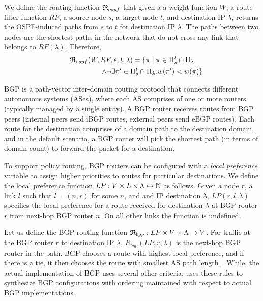 We define the routing function 
$\mathfrak{R}_{ospf}$ 
that given a 
a weight function $W$,
a route-filter function $RF$,
a source node $s$,
a target node $t$,
and destination IP 
$\lambda$,
returns the OSPF-induced paths from $s$ to $t$ for destination IP $\lambda$.
The paths between two nodes are
the shortest paths in the network
that do not cross any link that belongs to $RF(\lambda)$. 
 Therefore,
\begin{multline}
\mathfrak{R}_{ospf}(W,RF,s,t,\lambda) = \{\pi \mid  \pi\in \Pi_s^t\cap \Pi_\lambda\\
\hspace{2cm} \wedge \neg\exists \pi'\in\Pi_s^t\cap \Pi_\lambda . w(\pi')< w(\pi)\}
\end{multline}



BGP is a path-vector inter-domain 
routing protocol that connects 
different autonomous systems (ASes), where each AS
comprises of one or more routers (typically managed
by a single entity). A BGP router receives routes 
from BGP peers (internal peers send iBGP routes, 
external peers send eBGP routes). Each route 
for the destination comprises of a domain path
 to the destination domain, and in the default
 scenario, a BGP router will pick the shortest
 path (in terms of domain count) to forward
 the packet for a destination. 
 
To support policy routing, BGP routers can be 
configured with a \emph{local preference} variable
to assign higher priorities to routes for particular
destinations. We define the local preference function 
$LP: V \times L \times \Lambda \mapsto \mathbb{N}$ as follows.
Given a node $r$, a link $l$ such that $l=(n,r)$ for some $n$,
and and IP destination $\lambda$,
  $LP(r, l, \lambda)$ 
specifies the local preference for a route received 
for destination $\lambda$ at BGP router $r$ 
from next-hop BGP router $n$. 
On all other links the function is undefined.

Let us define the BGP routing function 
$\mathfrak{R}_{bgp}: LP \times V \times \Lambda \rightarrow V$.
For traffic at the BGP router $r$ to
destination IP $\lambda$, $R_{bgp}(LP,r,\lambda)$ 
is the next-hop BGP router in the path. BGP 
chooses a route with highest local preference, and
if there is a tie, it then chooses the route with smallest
AS path length~\cite{bgp}. While, the actual implementation
of BGP uses several other criteria,
\name uses these rules to synthesize BGP configurations with 
ordering maintained with respect to actual BGP implementations.


